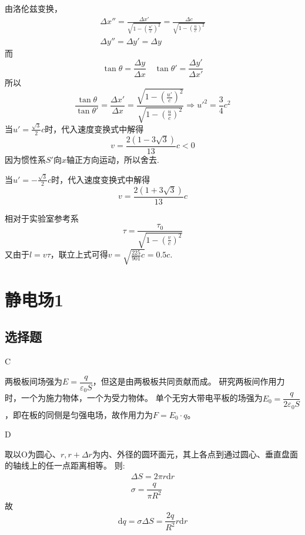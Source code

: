 \documentclass[b5paper,opensource,sourcefont,parskip]{qyxf-book}
\newcommand{\di}[1]{\mathrm{d}#1}
\begin{document}
由洛伦兹变换，
\begin{align*}
\Delta x''=\frac{\Delta x'}{\sqrt{1-(\frac{u'}{c})^2}}=\frac{\Delta c}{\sqrt{1-(\frac{u}{c})^2}}\\\Delta y''=\Delta y'=\Delta y
\end{align*}
而
\begin{equation*}
\tan{\theta}=\frac{\Delta y}{\Delta x}\quad \tan{\theta'}=\frac{\Delta y'}{\Delta x'}
\end{equation*}
所以
\begin{equation*}
\frac{\tan{\theta}}{\tan{\theta'}}=\frac{\Delta x'}{\Delta x}=\frac{\sqrt{1-(\frac{u'}{c})^2}}{\sqrt{1-(\frac{u}{c})^2}}\Rightarrow u'^2=\frac{3}{4}c^2
\end{equation*}
当$u'=\frac{\sqrt{3}}{2}c$时，代入速度变换式中解得
\begin{equation*}
v=\frac{2(1-3\sqrt{3})}{13}c<0
\end{equation*}
因为惯性系$S'$向$x$轴正方向运动，所以舍去.

当$u'=-\frac{\sqrt{3}}{2}c$时，代入速度变换式中解得
\begin{equation*}
v=\frac{2(1+3\sqrt{3})}{13}c
\end{equation*}


\solve
相对于实验室参考系
\begin{equation*}
\tau=\frac{\tau_0}{\sqrt{1-(\frac{v}{c})^2}}
\end{equation*}
又由于$l=v\tau$，联立上式可得$v=\sqrt{\frac{225}{901}c}=0.5c$.

\chapter{静电场1}
\section{选择题}

C

\solve
两极板间场强为$E=\dfrac{q}{\varepsilon_0S}$，但这是由两极板共同贡献而成。
研究两板间作用力时，一个为施力物体，一个为受力物体。
单个无穷大带电平板的场强为$E_0=\dfrac{q}{2\varepsilon_0S}$，即在板的同侧是匀强电场，故作用力为$F=E_0\cdot q$。

D

\solve
取以O为圆心、$r,r+\Delta r$为内、外径的圆环面元，其上各点到通过圆心、垂直盘面的轴线上的任一点距离相等。
则:
\begin{gather*}
	\Delta S=2\pi r\di{r}\\
	\sigma=\dfrac{q}{\pi R^2}
\end{gather*}
故
\begin{equation*}
	\di{q}=\sigma \Delta S=\dfrac{2q}{R^2}r\di{r}
\end{equation*}
\end{document}
